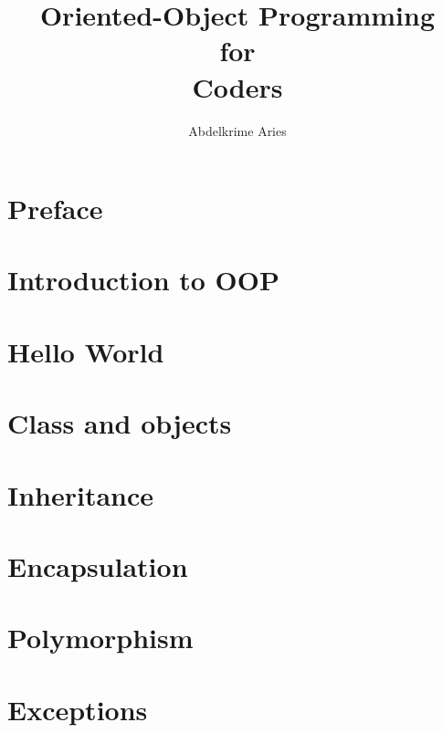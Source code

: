 \documentclass{KodeBook}
\title{Oriented-Object Programming\\ for\\ Coders}
\author{Abdelkrime Aries}
\begin{document}
\maketitle



\chapter*{Preface}


\chapter{Introduction to OOP}


\chapter{Hello World}


\chapter{Class and objects}

\chapter{Inheritance}

\chapter{Encapsulation}

\chapter{Polymorphism}

\chapter{Exceptions}
\end{document}
